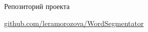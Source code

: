 \documentclass[final]{beamer}
\newlength{\sepwid}
\newlength{\onecolwid}
\begin{document}
\begin{frame}
\begin{columns}[t]
\begin{column}{\onecolwid}


\begin{block}{Репозиторий проекта}

\href{https://github.com/leramorozova/WordSegmentator}{github.com/leramorozova/WordSegmentator}

\end{block}

\end{column} %

\begin{column}{\sepwid}\end{column} %

\end{columns} %

\end{frame} %
\end{document}
